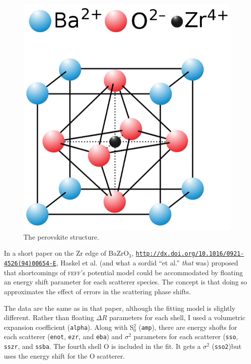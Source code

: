 \documentclass{article}
\begin{document}
\begin{figure}
  \includegraphics[width=\linewidth]{BaZrO3/perovskite.png}
  \caption{The perovskite structure.}
\end{figure}
In a short paper on the Zr edge of BaZrO$_3$,
\href{http://dx.doi.org/10.1016/0921-4526(94)00654-E}
{\texttt{http://dx.doi.org/10.1016/0921-4526(94)00654-E}}, Haskel et
al. (and what a sordid ``et al.'' \textit{that} was) proposed that
shortcomings of \textsc{feff}'s potential model could be accommodated
by floating an energy shift parameter for each scatterer species.  The
concept is that doing so approximates the effect of errors in the
scattering phase shifts.

The data are the same as in that paper, although the fitting model is
slightly different.  Rather than floating $\Delta R$ parameters for
each shell, I used a volumetric expansion coefficient
(\texttt{alpha}).  Along with S$_0^2$ (\texttt{amp}), there are energy
shofts for each scatterer (\texttt{enot}, \texttt{ezr}, and
\texttt{eba}) and $\sigma^2$ parameters for each scatterer
(\texttt{sso}, \texttt{sszr}, and \texttt{ssba}.  The fourth shell O
is included in the fit.  It gets a $\sigma^2$ (\texttt{sso2})but uses
the energy shift for the O scatterer.
\end{document}
